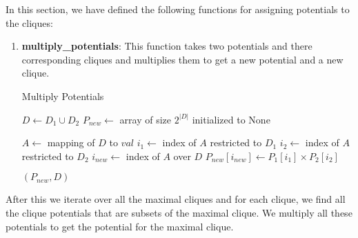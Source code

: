 \documentclass[12pt]{article}
\begin{document}
In this section, we have defined the following functions for assigning potentials to the cliques:

\begin{enumerate}
    \item \textbf{multiply\_potentials}: This function takes two potentials and there corresponding cliques and multiplies them to get a new potential and a new clique.
    
    \begin{algorithm}
        \caption{Multiply Potentials}
        \begin{algorithmic}[1]
            \State $D \gets D_1 \cup D_2$
            \State $P_{new} \gets$ array of size $2^{|D|}$ initialized to None
        
                \State $A \gets$ mapping of $D$ to $val$
                \State $i_1 \gets$ index of $A$ restricted to $D_1$
                \State $i_2 \gets$ index of $A$ restricted to $D_2$
                \State $i_{new} \gets$ index of $A$ over $D$
                \State $P_{new}[i_{new}] \gets P_1[i_1] \times P_2[i_2]$
            \EndFor
        
            \State \Return $(P_{new}, D)$
        \EndFunction
        \end{algorithmic}
    \end{algorithm}
        
\end{enumerate}

After this we iterate over all the maximal cliques and for each clique, we find all the clique potentials that are subsets of the maximal clique. We multiply all these potentials to get the potential for the maximal clique.
\end{document}

